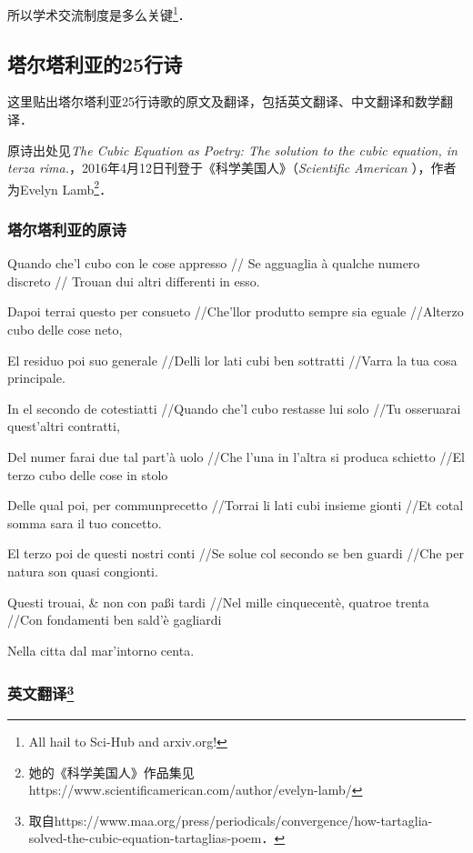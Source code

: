 所以学术交流制度是多么关键\footnote{All hail to Sci-Hub and arxiv.org! }．


\subsection{塔尔塔利亚的25行诗}

这里贴出塔尔塔利亚25行诗歌的原文及翻译，包括英文翻译、中文翻译和数学翻译．

原诗出处见\textsl{The Cubic Equation as Poetry:
The solution to the cubic equation, in terza rima.}，2016年4月12日刊登于《科学美国人》（\textsl{Scientific American} ），作者为Evelyn Lamb\footnote{她的《科学美国人》作品集见https://www.scientificamerican.com/author/evelyn-lamb/}．



\subsubsection{塔尔塔利亚的原诗}

Quando che'l cubo con le cose appresso 
//
Se agguaglia à qualche numero discreto
//
Trouan dui altri differenti in esso.



Dapoi terrai questo per consueto
​//Che'llor produtto sempre sia eguale
//​Alterzo cubo delle cose neto,
 

El residuo poi suo generale 
//Delli lor lati cubi ben sottratti
//​Varra la tua cosa principale.
 

In el secondo de cotestiatti 
​//Quando che'l cubo restasse lui solo 
//Tu osseruarai quest'altri contratti,
 

Del numer farai due tal part'à uolo 
//Che l'una in l'altra si produca schietto
//El terzo cubo delle cose in stolo
​

Delle qual poi, per communprecetto 
​//Torrai li lati cubi insieme gionti 
//Et cotal somma sara il tuo concetto.
 

El terzo poi de questi nostri conti 
//Se solue col secondo se ben guardi 
//Che per natura son quasi congionti.
 

Questi trouai, & non con paßi tardi 
//Nel mille cinquecentè, quatroe trenta 
//Con fondamenti ben sald'è gagliardi
​

Nella citta dal mar'intorno centa.


\subsubsection{英文翻译\footnote{取自https://www.maa.org/press/periodicals/convergence/how-tartaglia-solved-the-cubic-equation-tartaglias-poem．}}

